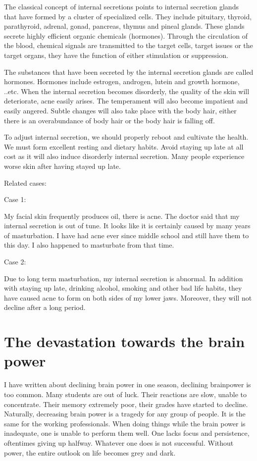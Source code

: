 \documentclass[
]{book}
\begin{document}
The classical concept of internal secretions points to internal secretion glands that have formed by a cluster of specialized cells. They include pituitary, thyroid, parathyroid, adrenal, gonad, pancreas, thymus and pineal glands. These glands secrete highly efficient organic chemicals (hormones). Through the circulation of the blood, chemical signals are transmitted to the target cells, target issues or the target organs, they have the function of either stimulation or suppression.

The substances that have been secreted by the internal secretion glands are called hormones. Hormones include estrogen, androgen, lutein and growth hormone, ..etc. When the internal secretion becomes disorderly, the quality of the skin will deteriorate, acne easily arises. The temperament will also become impatient and easily angered. Subtle changes will also take place with the body hair, either there is an overabundance of body hair or the body hair is falling off.

To adjust internal secretion, we should properly reboot and cultivate the health. We must form excellent resting and dietary habits. Avoid staying up late at all cost as it will also induce disorderly internal secretion. Many people experience worse skin after having stayed up late.

Related cases:

Case 1:

My facial skin frequently produces oil, there is acne. The doctor said that my internal secretion is out of tune. It looks like it is certainly caused by many years of masturbation. I have had acne ever since middle school and still have them to this day. I also happened to masturbate from that time.

Case 2:

Due to long term masturbation, my internal secretion is abnormal. In addition with staying up late, drinking alcohol, smoking and other bad life habits, they have caused acne to form on both sides of my lower jaws. Moreover, they will not decline after a long period.

\hypertarget{the-devastation-towards-the-brain-power}{%
\section{The devastation towards the brain power}\label{the-devastation-towards-the-brain-power}}

I have written about declining brain power in one season, declining brainpower is too common. Many students are out of luck. Their reactions are slow, unable to concentrate. Their memory extremely poor, their grades have started to decline. Naturally, decreasing brain power is a tragedy for any group of people. It is the same for the working professionals. When doing things while the brain power is inadequate, one is unable to perform them well. One lacks focus and persistence, oftentimes giving up halfway. Whatever one does is not successful. Without power, the entire outlook on life becomes grey and dark.
\end{document}
